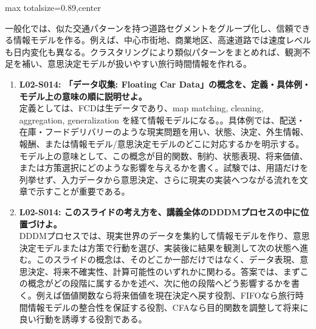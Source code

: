 \begin{minipage}[t]{0.58\textwidth}
\begin{adjustbox}{max totalsize={\textwidth}{0.89\textheight},center}
\begin{minipage}{\textwidth}
一般化では、似た交通パターンを持つ道路セグメントをグループ化し、信頼できる情報モデルを作る。例えば、中心市街地、商業地区、高速道路では速度レベルも日内変化も異なる。クラスタリングにより類似パターンをまとめれば、観測不足を補い、意思決定モデルが扱いやすい旅行時間情報を作れる。\par{}\begin{enumerate}\item \textbf{L02-S014: 「データ収集: Floating Car Data」の概念を、定義・具体例・モデル上の意味の順に説明せよ。}\\定義としては、FCDは生データであり、map matching, cleaning, aggregation, generalization を経て情報モデルになる。。具体例では、配送・在庫・フードデリバリーのような現実問題を用い、状態、決定、外生情報、報酬、または情報モデル/意思決定モデルのどこに対応するかを明示する。モデル上の意味として、この概念が目的関数、制約、状態表現、将来価値、または方策選択にどのような影響を与えるかを書く。試験では、用語だけを列挙せず、入力データから意思決定、さらに現実の実装へつながる流れを文章で示すことが重要である。\item \textbf{L02-S014: このスライドの考え方を、講義全体のDDDMプロセスの中に位置づけよ。}\\DDDMプロセスでは、現実世界のデータを集約して情報モデルを作り、意思決定モデルまたは方策で行動を選び、実装後に結果を観測して次の状態へ進む。このスライドの概念は、そのどこか一部だけではなく、データ表現、意思決定、将来不確実性、計算可能性のいずれかに関わる。答案では、まずこの概念がどの段階に属するかを述べ、次に他の段階へどう影響するかを書く。例えば価値関数なら将来価値を現在決定へ戻す役割、FIFOなら旅行時間情報モデルの整合性を保証する役割、CFAなら目的関数を調整して将来に良い行動を誘導する役割である。\end{enumerate}
\end{minipage}
\end{adjustbox}
\end{minipage}


